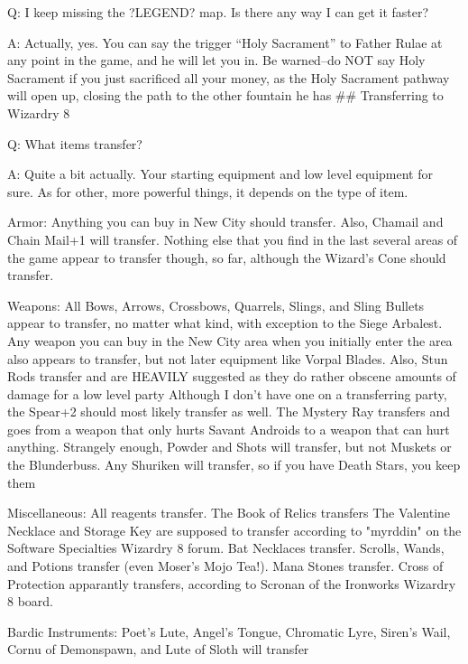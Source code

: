 \documentclass[12pt]{article}
\begin{document}
Q: I keep missing the ?LEGEND? map. Is there any way I can get it
faster?

A: Actually, yes. You can say the trigger ``Holy Sacrament'' to Father
Rulae at any point in the game, and he will let you in. Be warned--do
NOT say Holy Sacrament if you just sacrificed all your money, as the
Holy Sacrament pathway will open up, closing the path to the other
fountain he has \#\# Transferring to Wizardry 8

Q: What items transfer?

A: Quite a bit actually. Your starting equipment and low level equipment
for sure. As for other, more powerful things, it depends on the type of
item.

Armor:  Anything you can buy in New City should transfer.  Also, Chamail
        and Chain Mail+1 will transfer.  Nothing else that you find in the
        last several areas of the game appear to transfer though, so far,
        although the Wizard's Cone should transfer.

Weapons:  All Bows, Arrows, Crossbows, Quarrels, Slings, and Sling Bullets
          appear to transfer, no matter what kind, with exception to the
          Siege Arbalest.  Any weapon you can buy in the New City area
          when you initially enter the area also appears to transfer, but
          not later equipment like Vorpal Blades.  Also, Stun Rods
          transfer and are HEAVILY suggested as they do rather obscene
          amounts of damage for a low level party
          Although I don't have one on a transferring party, the Spear+2
          should most likely transfer as well.  The Mystery Ray transfers
          and goes from a weapon that only hurts Savant Androids to a
          weapon that can hurt anything.  Strangely enough, Powder and
          Shots will transfer, but not Muskets or the Blunderbuss.  Any
          Shuriken will transfer, so if you have Death Stars, you keep
          them

Miscellaneous:  All reagents transfer.  The Book of Relics transfers
                The Valentine Necklace and Storage Key are supposed to
                transfer according to "myrddin" on the Software Specialties
                Wizardry 8 forum.  Bat Necklaces transfer.  Scrolls, Wands,
                and Potions transfer (even Moser's Mojo Tea!).  Mana Stones
                transfer.  Cross of Protection apparantly transfers,
                according to Scronan of the Ironworks Wizardry 8 board.

Bardic Instruments: Poet's Lute, Angel's Tongue, Chromatic Lyre,
Siren's Wail, Cornu of Demonspawn, and Lute of Sloth will transfer
\end{document}
